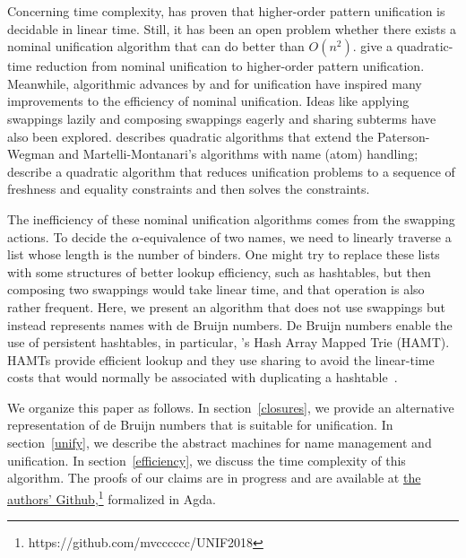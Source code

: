 \documentclass{easychair}
\begin{document}
Concerning time complexity, \citet{qian_unification_1996} has proven that
higher-order pattern unification is decidable in linear time.
Still, it has been an open problem whether there exists a nominal
unification algorithm that can do better than
$O(n^2)$. \citet{levy_nominal_2012} give a quadratic-time reduction
from nominal unification to higher-order pattern unification.
Meanwhile, algorithmic advances by \citet{paterson_linear_1978} and
\citet{martelli_efficient_1982} for unification have inspired many
improvements to the efficiency of nominal unification. Ideas
like applying swappings lazily and composing swappings eagerly and
sharing subterms have also been explored. \citet{calves_complexity_2010}
describes quadratic algorithms that extend the Paterson-Wegman and
Martelli-Montanari's algorithms with name (atom) handling;
\citet{levy_efficient_2010} describe a quadratic algorithm that
reduces unification problems to a sequence of freshness and equality
constraints and then solves the constraints.

The inefficiency of these nominal unification algorithms comes from
the swapping actions. To decide the $\alpha$-equivalence of
two names, we need to linearly traverse a list whose length 
is the number of binders. One might try to replace these
lists with some structures of better lookup efficiency,
such as hashtables,
but then composing two swappings would take linear time, and that
operation is also rather frequent. Here, we present an algorithm that
does not use swappings but instead represents names with de Bruijn
numbers. De Bruijn numbers enable the use of persistent hashtables, in
particular, \citeauthor{bagwell_ideal_2001}'s Hash Array Mapped Trie
(HAMT). HAMTs provide efficient lookup and
they use sharing to avoid the linear-time costs that would normally be
associated with duplicating a hashtable~\citep{bagwell_ideal_2001}.

We organize this paper as follows. In section~\ref{closures}, we provide
an alternative representation of de Bruijn numbers that is suitable
for unification. In section~\ref{unify}, we describe the abstract
machines for name management and unification. In
section~\ref{efficiency}, we discuss the time complexity of this
algorithm. The proofs of our claims are in progress and are available
at \href{https://github.com/mvcccccc/UNIF2018}{the authors' Github},\footnote{https://github.com/mvcccccc/UNIF2018}
formalized in Agda.
\end{document}
